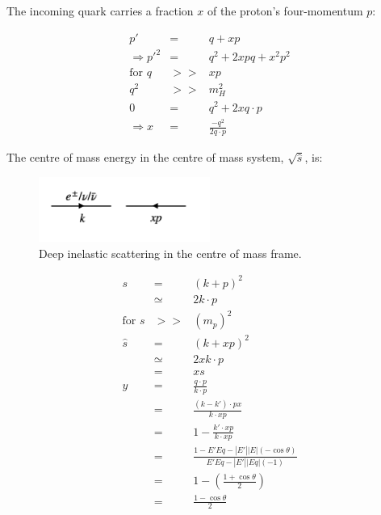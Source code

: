 The incoming quark carries a fraction $x$ of the proton's four-momentum $p$:

\begin{eqnarray*}
  p' & = & q + xp \\
  \Rightarrow p'^2 & = & q^2 + 2xpq + x^2p^2 \\
  \textrm{for } q & >> & xp \\
  q^2 & >> & m_H^2 \\
  0 & = & q^2 + 2xq \cdot p \\
  \Rightarrow x & = & \frac{-q^2}{2q \cdot p}
\end{eqnarray*}

The centre of mass energy in the centre of mass system, $\sqrt{\hat{s}}$, is:

\begin{figure}[!htb]
  \begin{center}
    \includegraphics[width=0.5\textwidth]{images/web_feynman/image_62.png}
    \caption[CM deep inelastic scattering]{Deep inelastic scattering in the centre of mass frame.}
    \label{fig:ch14_DISCM}
  \end{center}
\end{figure}

\begin{eqnarray*}
  s & = & \left(k + p\right)^2 \\
  & \simeq & 2k \cdot p \\
  \textrm{for } s & >> & \left(m_p\right)^2 \\
  \hat{s} & = & \left(k + xp\right)^2 \\
  & \simeq & 2xk \cdot p \\
  & = & xs \\
  y & = & \frac{q \cdot p}{k \cdot p} \\
  & = & \frac{\left(k - k'\right) \cdot px}{k \cdot xp} \\
  & = & 1 - \frac{k' \cdot xp}{k \cdot xp} \\
  & = & \frac{1 - E'Eq - |E'||E|\left(-\cos\theta\right)}{E'Eq - |E'||Eq|\left(-1\right)} \\
  & = & 1 - \left(\frac{1 + \cos\theta}{2}\right) \\
  & = & \frac{1 - \cos\theta}{2}
\end{eqnarray*}


